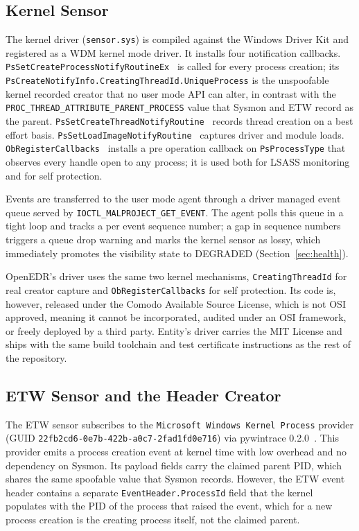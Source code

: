 \documentclass[10pt,twocolumn,letterpaper]{article}
\newcommand{\code}[1]{\texttt{\small #1}}
\begin{document}
\subsection{Kernel Sensor}
\label{sec:kernel}

The kernel driver (\code{sensor.sys}) is compiled against the Windows Driver Kit and
registered as a WDM kernel mode driver. It installs four notification callbacks.
\code{PsSetCreateProcessNotifyRoutineEx}~\cite{psnotify} is called for every process
creation; its \code{PsCreateNotifyInfo.CreatingThreadId.UniqueProcess} is the
unspoofable kernel recorded creator that no user mode API can alter, in contrast with the
\code{PROC\_THREAD\_ATTRIBUTE\_PARENT\_PROCESS} value that Sysmon and ETW record as the
parent. \code{PsSetCreateThreadNotifyRoutine}~\cite{psnotify} records thread creation on
a best effort basis. \code{PsSetLoadImageNotifyRoutine}~\cite{psnotify} captures driver
and module loads. \code{ObRegisterCallbacks}~\cite{obregister} installs a pre operation
callback on \code{PsProcessType} that observes every handle open to any process; it is
used both for LSASS monitoring and for self protection.

Events are transferred to the user mode agent through a driver managed event queue
served by \code{IOCTL\_MALPROJECT\_GET\_EVENT}. The agent polls this queue in a tight
loop and tracks a per event sequence number; a gap in sequence numbers triggers a queue
drop warning and marks the kernel sensor as lossy, which immediately promotes the
visibility state to DEGRADED (Section~\ref{sec:health}).

OpenEDR's driver uses the same two kernel mechanisms, \code{CreatingThreadId} for real
creator capture and \code{ObRegisterCallbacks} for self protection. Its code is, however,
released under the Comodo Available Source License, which is not OSI approved, meaning it
cannot be incorporated, audited under an OSI framework, or freely deployed by a
third party. Entity's driver carries the MIT License and ships with the same build
toolchain and test certificate instructions as the rest of the repository.

\subsection{ETW Sensor and the Header Creator}
\label{sec:etw}

The ETW sensor subscribes to the \texttt{Microsoft\hyphenchar{}
Windows\hyphenchar{} Kernel\hyphenchar{} Process} provider (GUID
\code{22fb2cd6\allowbreak-0e7b\allowbreak-422b\allowbreak-a0c7\allowbreak-2fad1fd0e716})
via pywintrace 0.2.0~\cite{pywintrace}. This provider emits a process creation event at
kernel time with low overhead and no dependency on Sysmon. Its payload fields carry the
claimed parent PID, which shares the same spoofable value that Sysmon records. However,
the ETW event header contains a separate \code{EventHeader.ProcessId} field that the
kernel populates with the PID of the process that raised the event, which for a new
process creation is the creating process itself, not the claimed parent.
\end{document}
